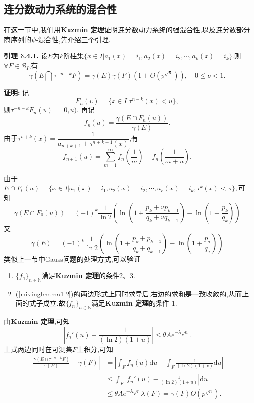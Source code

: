 \subsection{连分数动力系统的混合性}
在这一节中,我们用\textbf{Kuzmin 定理}证明连分数动力系统的强混合性,以及连分数部分商序列的$\psi$-混合性,先介绍三个引理.\par
\textbf{引理 3.4.1.  }\textsuperscript{\cite{Liu_Peng,Mixing_lemma}}
设$E$为$k$阶柱集$\{x\in I|a_1(x)=i_1,a_2(x)=i_2,\cdots,a_k(x)=i_k\}$.则$\forall F\in\mathcal{B}_I$,有
\begin{equation}\label{mixinglemma1.1}
\gamma(E\bigcap \tau^{-n-k}F)=\gamma(E)\gamma(F)(1+O(p^{\sqrt{n}})),\quad 0\leqslant p<1.
\end{equation}
\par
\textbf{证明:  }
记
$$F_n(u)=\{x\in I|\tau^{n+k}(x)<u\},$$
则$\tau^{-n-k}F_n(u)=[0,u).$
再记
$$f_n(u)=\dfrac{\gamma(E\cap F_n(u))}{\gamma(E)}.$$
由于$\tau^{n+k}(x)=\dfrac{1}{a_{n+k+1}+\tau^{n+k+1}(x)}$,有
\begin{equation}\label{mixinglemma1.2}
f_{n+1}(u)=\sum_{m=1}^\infty f_{n}\left(\dfrac{1}{m}\right)-f_{n}\left(\dfrac{1}{m+u}\right).
\end{equation}\par
由于$E\cap F_0(u)=\{x\in I|a_1(x)=i_1,a_2(x)=i_2,\cdots,a_k(x)=i_k,\tau^{k}(x)<u\},$可知
$$\gamma(E\cap F_0(u))=(-1)^k\frac{1}{\ln2}\left(\ln\left(1+\frac{p_k+up_{k-1}}{q_k+uq_{k-1}}\right)-\ln\left(1+\frac{p_k}{q_k}\right)\right)$$
又
$$\gamma(E)=(-1)^k\frac{1}{\ln2}\left(\ln\left(1+\frac{p_k+p_{k-1}}{q_k+q_{k-1}}\right)-\ln\left(1+\frac{p_n}{q_n}\right)\right)$$
类似上一节中Gauss问题的处理方式,可以验证
\begin{enumerate}
    \item $\{f_n\}_{n\in\mathbb{N}}$满足\textbf{Kuzmin 定理}的条件2、3.
    \item (\ref{mixinglemma1.2})的两边形式上同时求导后,右边的求和是一致收敛的,从而上面的式子成立.故$\{f_n\}_{n\in\mathbb{N}}$满足\textbf{Kuzmin 定理}的条件 1.
\end{enumerate}\par
由\textbf{Kuzmin 定理},可知
$$|f_n'(u)-\frac{1}{(\ln 2)(1+u)}|\leqslant \theta A e^{-\lambda \sqrt{n}}.$$
上式两边同时在可测集$F$上积分,可知\\
\begin{align*}
    \left|\frac{\gamma(E\cap \tau^{-n-k}F)}{\gamma(E)}-\gamma(F)\right|&=\left|\int_F f_n(u)\mathrm{d}u-\int_F \frac{1}{(\ln 2)(1+u)}\mathrm{d}u\right|\\
    &\leqslant\int_F\left|f_n'(u)-\frac{1}{(\ln 2)(1+u)}\right|\mathrm{d}u\\
    &\leqslant\theta A e^{-\lambda\sqrt{n}}\lambda(F)=\gamma(F)O(p^{\sqrt{n}}).
\end{align*}

